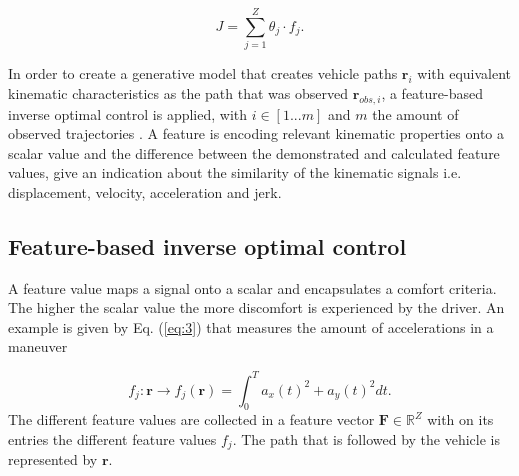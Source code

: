 \begin{equation}\label{eq:1}
	J = \sum_{j=1}^{Z}\theta_j\cdot f_j	.
\end{equation}


In order to create a generative model that creates vehicle paths $\bm{r}_i$ with equivalent kinematic characteristics as the path that was observed $\bm{r}_{obs,i}$, a feature-based inverse optimal control is applied, with $i \in [1 ... m]$ and $m$ the amount of observed trajectories \cite{Kuderer2015a,Abbeel2004}. A feature is encoding relevant kinematic properties onto a scalar value and the difference between the demonstrated and calculated feature values, give an indication about the similarity of the kinematic signals i.e. displacement, velocity, acceleration and jerk. \\

\subsection{Feature-based inverse optimal control}
A feature value maps a signal onto a scalar and encapsulates a comfort criteria. The higher the scalar value the more discomfort is experienced by the driver. An example is given by Eq. (\ref{eq:3}) that measures the amount of accelerations in a maneuver

\begin{equation}\label{eq:3}
f_j:\bm{r}\xrightarrow{}f_j(\bm{r})=\int_{0}^{T}a_x(t)^{2}+a_y(t)^{2} dt.
\end{equation}
The different feature values are collected in a feature vector $\bm{F} \in \mathbb{R}^Z$ with on its entries the different feature values $f_j$.
The path that is followed by the vehicle is represented by $\bm{r}$.


